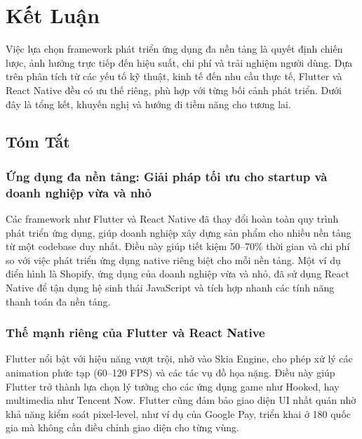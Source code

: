 \section{Kết Luận}

\begin{flushleft}
  \hspace*{0.8cm}Việc lựa chọn framework phát triển ứng dụng đa nền tảng là quyết định chiến lược, ảnh hưởng trực tiếp đến hiệu suất, chi phí và trải nghiệm người dùng. Dựa trên phân tích từ các yếu tố kỹ thuật, kinh tế đến nhu cầu thực tế, Flutter và React Native đều có ưu thế riêng, phù hợp với từng bối cảnh phát triển. Dưới đây là tổng kết, khuyến nghị và hướng đi tiềm năng cho tương lai.
\end{flushleft}

\subsection{Tóm Tắt}
\subsubsection{Ứng dụng đa nền tảng: Giải pháp tối ưu cho startup và doanh nghiệp vừa và nhỏ}
\begin{flushleft}
    \hspace*{0.8cm}Các framework như Flutter và React Native đã thay đổi hoàn toàn quy trình phát triển ứng dụng, giúp doanh nghiệp xây dựng sản phẩm cho nhiều nền tảng từ một codebase duy nhất. Điều này giúp tiết kiệm 50–70\% thời gian và chi phí so với việc phát triển ứng dụng native riêng biệt cho mỗi nền tảng. Một ví dụ điển hình là Shopify, ứng dụng của doanh nghiệp vừa và nhỏ, đã sử dụng React Native để tận dụng hệ sinh thái JavaScript và tích hợp nhanh các tính năng thanh toán đa nền tảng.
\end{flushleft}

\subsubsection{Thế mạnh riêng của Flutter và React Native}
\begin{flushleft}
    \hspace*{0.8cm}Flutter nổi bật với hiệu năng vượt trội, nhờ vào Skia Engine, cho phép xử lý các animation phức tạp (60–120 FPS) và các tác vụ đồ họa nặng. Điều này giúp Flutter trở thành lựa chọn lý tưởng cho các ứng dụng game như Hooked, hay multimedia như Tencent Now. Flutter cũng đảm bảo giao diện UI nhất quán nhờ khả năng kiểm soát pixel-level, như ví dụ của Google Pay, triển khai ở 180 quốc gia mà không cần điều chỉnh giao diện cho từng vùng.
\end{flushleft}


